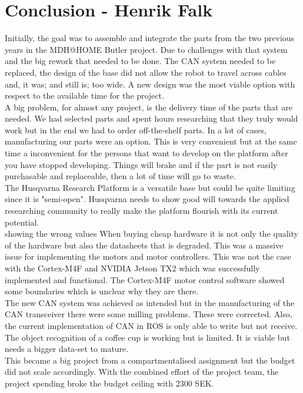 

\section{Conclusion - Henrik Falk}
Initially, the goal was to assemble and integrate the parts from the two previous years in the MDH@HOME Butler project. Due to challenges with that system and the big rework that needed to be done. The CAN system needed to be replaced, the design of the base did not allow the robot to travel across cables and, it was; and still is; too wide. A new design was the most viable option with respect to the available time for the project.\\
\indent A big problem, for almost any project, is the delivery time of the parts that are needed. We had selected parts and spent hours researching that they truly would work but in the end we had to order off-the-shelf parts. In a lot of cases, manufacturing our parts were an option. This is very convenient but at the same time a inconvenient for the persons that want to develop on the platform after you have stopped developing. Things will brake and if the part is not easily purchasable and replaceable, then a lot of time will go to waste.\\
\indent The Husqvarna Research Platform is a versatile base but could be quite limiting since it is "semi-open". Husqvarna needs to show good will towards the applied researching community to really make the platform flourish with its current potential.\\
\indent  showing the wrong values When buying cheap hardware it is not only the quality of the hardware but also the datasheets that is degraded. This was a massive issue for implementing the motors and motor controllers. This was not the case with the Cortex-M4F and NVIDIA Jetson TX2 which was successfully implemented and functional. The Cortex-M4F motor control software showed some boundaries which is unclear why they are there.\\
\indent The new CAN system was achieved as intended but in the manufacturing of the CAN transceiver there were some milling problems. These were corrected. Also, the current implementation of CAN in ROS is only able to write but not receive.\\
\indent The object recognition of a coffee cup is working but is limited. It is viable but needs a bigger data-set to mature.\\
\indent This became a big project from a compartmentalised assignment but the budget did not scale accordingly. With the combined effort of the project team, the project spending broke the budget ceiling with 2300 SEK.\\
